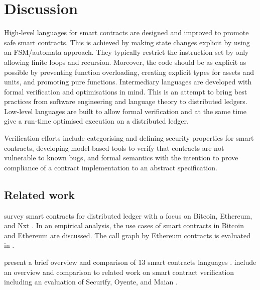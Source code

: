 \section{Discussion}
\label{discuss}

High-level languages for smart contracts are designed and improved to promote safe smart contracts.
This is achieved by making state changes explicit by using an FSM/automata approach. 
They typically restrict the instruction set by only allowing finite loops and recursion.
Moreover, the code should be as explicit as possible by preventing function overloading, creating explicit types for assets and units, and promoting pure functions.
Intermediary languages are developed with formal verification and optimisations in mind.
This is an attempt to bring best practices from software engineering and language theory to distributed ledgers.
Low-level languages are built to allow formal verification and at the same time give a run-time optimised execution on a distributed ledger.

Verification efforts include categorising and defining security properties for smart contracts, developing model-based tools to verify that contracts are not vulnerable to known bugs, and formal semantics with the intention to prove compliance of a contract implementation to an abstract specification.

\subsection{Related work}
\citeauthor{Seijas2017} survey smart contracts for distributed ledger with a focus on Bitcoin, Ethereum, and Nxt \cite{Seijas2017}.
In an empirical analysis, the use cases of smart contracts in Bitcoin and Ethereum are discussed\cite{Bartoletti2017}.
The call graph by Ethereum contracts is evaluated in \cite{Frowis2017}.

\citeauthor{Sergey2018} present a brief overview and comparison of 13 smart contracts languages \cite{Sergey2018}. \citeauthor{Tsankov2017} include an overview and comparison to related work on smart contract verification including an evaluation of Securify, Oyente, and Maian \cite{Tsankov2017}.


